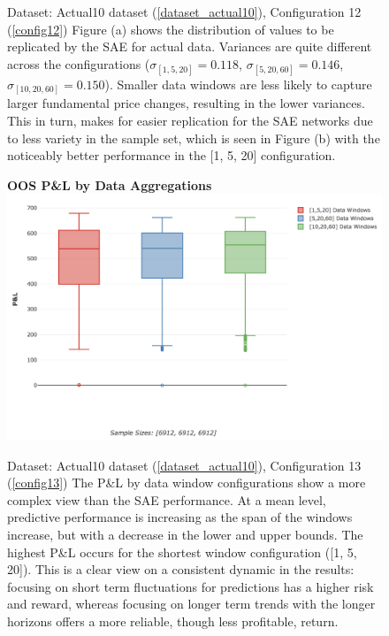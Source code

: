 \documentclass[a4paper,11pt,oneside]{article}
\theoremstyle{plain}
\theoremstyle{definition}
\begin{document}
\begin{figure}[H]
\begin{subfigure}{.5\textwidth}
			\label{figure-actual_aggregation_mse}
		\end{subfigure}
		\caption[SAE MSE Scores for Actual Data]{Dataset: Actual10 dataset (\ref{dataset_actual10}), Configuration 12 (\ref{config12})
			\newline Figure (a) shows the distribution of values to be replicated by the SAE for actual data. Variances are quite different across the configurations ($\sigma_{[1,5,20]} = 0.118$, $\sigma_{[5,20,60]} = 0.146$, $\sigma_{[10,20,60]} = 0.150$). Smaller data windows are less likely to capture larger fundamental price changes, resulting in the lower variances. This in turn, makes for easier replication for the SAE networks due to less variety in the sample set, which is seen in Figure (b) with the noticeably better performance in the [1, 5, 20] configuration.}
		\label{fig_data_sae_actual}
	\end{figure}
	
	
	
		\begin{figure}[H]
		\centering 
		\textbf{OOS P\&L by Data Aggregations}
		\includegraphics[scale=0.4]{images/results/data/actual_aggregation_pl.png}
		\caption[P\&L by Data Aggregation (Actual Data)]{
			Dataset: Actual10 dataset (\ref{dataset_actual10}), Configuration 13 (\ref{config13})
			\newline The P\&L by data window configurations show a more complex view than the SAE performance. At a mean level, predictive performance is increasing as the span of the windows increase, but with a decrease in the lower and upper bounds. The highest P\&L occurs for the shortest window configuration ([1, 5, 20]). This is a clear view on a consistent dynamic in the results: focusing on short term fluctuations for predictions has a higher risk and reward, whereas focusing on longer term trends with the longer horizons offers a more reliable, though less profitable, return.}
		\label{figure-actual_aggregation_pl}
	\end{figure}
	
\end{document}
